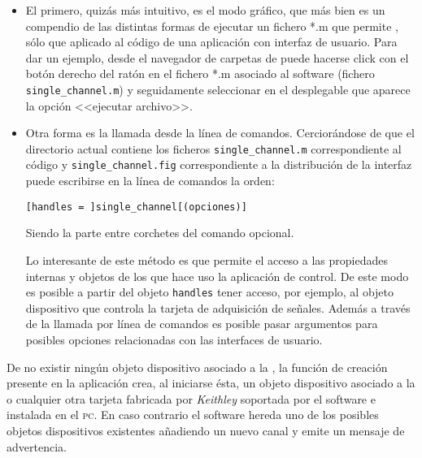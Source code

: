 \begin{itemize}
	\item El primero, quizás más intuitivo, es el modo gráfico, que más
		bien es un compendio de las distintas formas de ejecutar un
		fichero *.m que permite \matlab{}, sólo que aplicado al
		código de una aplicación con interfaz de usuario. Para dar
		un ejemplo, desde el navegador de carpetas de \matlab{}
		puede hacerse click con el botón derecho del ratón en el
		fichero *.m asociado al software (fichero
		\texttt{single\_channel.m}) y seguidamente seleccionar en
		el desplegable que aparece la opción <<ejecutar archivo>>.
	\item Otra forma es la llamada desde la línea de comandos.
		Cerciorándose de que el directorio actual contiene los
		ficheros \texttt{single\_channel.m} correspondiente al
		código y \texttt{single\_channel.fig} correspondiente a la
		distribución de la interfaz puede escribirse en la línea de
		comandos la orden:

		\begin{lstlisting}[gobble=16]
			[handles = ]single_channel[(opciones)]
		\end{lstlisting}

		Siendo la parte entre corchetes del comando opcional.

		Lo interesante de este método es que permite el acceso a
		las propiedades internas y objetos de los que hace uso la
		aplicación de control. De este modo es posible a partir del
		objeto \texttt{handles} tener acceso, por ejemplo, al
		objeto dispositivo que controla la tarjeta de adquisición
		de señales. Además a través de la llamada por línea de
		comandos es posible pasar argumentos para posibles opciones
		relacionadas con las interfaces de usuario.
\end{itemize}

De no existir ningún objeto dispositivo asociado a la \kpci{}, la función
de creación presente en la aplicación crea, al iniciarse ésta, un objeto
dispositivo asociado a la \kpci{} o cualquier otra tarjeta fabricada por
\emph{Keithley} soportada por el software e instalada en el \textsc{pc}. En
caso contrario el software hereda uno de los posibles objetos dispositivos
existentes añadiendo un nuevo canal y emite un mensaje de advertencia.

